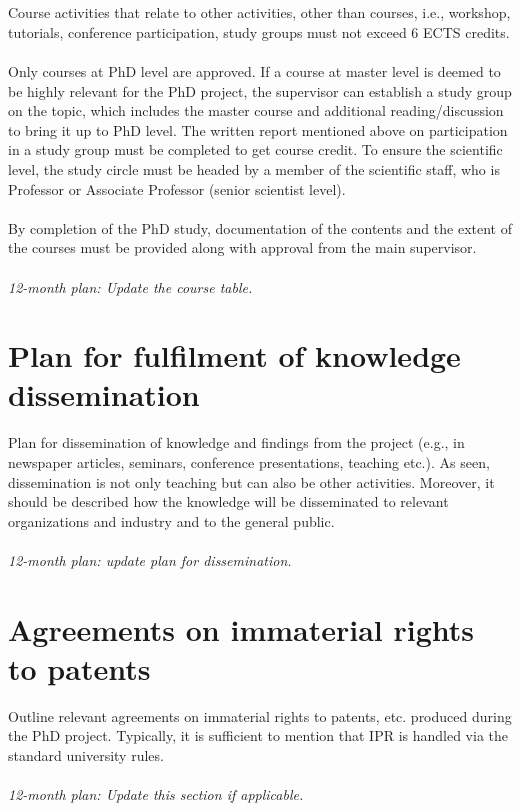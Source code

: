 \\
\\
Course activities that relate to other activities, other than courses, i.e., workshop, tutorials, conference participation, study groups must not exceed 6 ECTS credits.
\\
\\
Only courses at PhD level are approved. If a course at master level is deemed to be highly relevant for the PhD project, the supervisor can establish a study group on the topic, which includes the master course and additional reading/discussion to bring it up to PhD level. The written report mentioned above on participation in a study group must be completed to get course credit. To ensure the scientific level, the study circle must be headed by a member of the scientific staff, who is Professor or Associate Professor (senior scientist level). 
\\
\\
By completion of the PhD study, documentation of the contents and the extent of the courses must be provided along with approval from the main supervisor. 
\\
\\
\textit{12-month plan: Update the course table.}

\section{Plan for fulfilment of knowledge dissemination}
Plan for dissemination of knowledge and findings from the project (e.g., in newspaper articles, seminars, conference presentations, teaching etc.). As seen, dissemination is not only teaching but can also be other activities. Moreover, it should be described how the knowledge will be disseminated to relevant organizations and industry and to the general public.
\\
\\
\textit{12-month plan: update plan for dissemination.}


\section{Agreements on immaterial rights to patents}
Outline relevant agreements on immaterial rights to patents, etc. produced during the PhD project. Typically, it is sufficient to mention that IPR is handled via the standard university rules.
\\
\\  
\textit{12-month plan: Update this section if applicable.}

